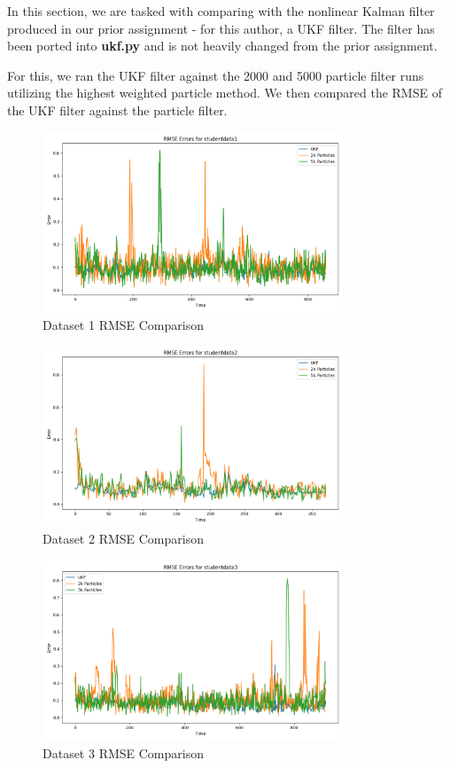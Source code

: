 \documentclass{article}
\begin{document}
In this section, we are tasked with comparing with the nonlinear Kalman filter produced in our prior assignment - for this author, a UKF filter. The filter has been ported into \textbf{ukf.py} and is not heavily changed from the prior assignment.

For this, we ran the UKF filter against the 2000 and 5000 particle filter runs utilizing the highest weighted particle method. We then compared the RMSE of the UKF filter against the particle filter.

\begin{figure}[H]
    \centering
    \includegraphics[width=0.8\textwidth]{./imgs/task3/studentdata1_rmse.png}
    \caption{Dataset 1 RMSE Comparison}
\end{figure}

\begin{figure}[H]
    \centering
    \includegraphics[width=0.8\textwidth]{./imgs/task3/studentdata2_rmse.png}
    \caption{Dataset 2 RMSE Comparison}
\end{figure}

\begin{figure}[H]
    \centering
    \includegraphics[width=0.8\textwidth]{./imgs/task3/studentdata3_rmse.png}
    \caption{Dataset 3 RMSE Comparison}
\end{figure}
\end{document}
